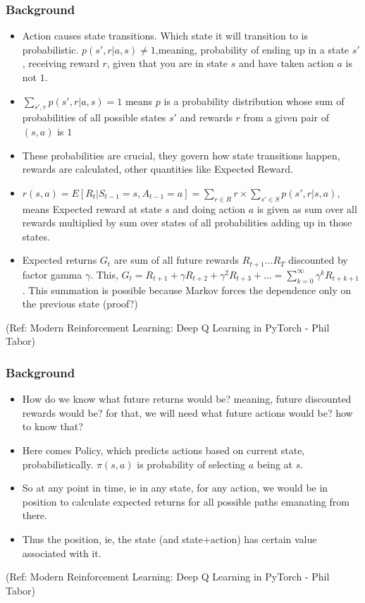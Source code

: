 \begin{frame}[fragile]\frametitle{Background}

\begin{itemize}
\item Action causes state transitions. Which state it will transition to is probabilistic. $p(s',r|a,s) \neq 1$,meaning,  probability of ending up in a state $s'$, receiving reward $r$, given that you are in state $s$ and have taken action $a$ is not $1$. 
\item $\sum_{s',r} p (s',r|a,s) = 1 $ means $p$ is a probability distribution whose sum of probabilities of all possible states $s'$ and rewards $r$ from a given pair of $(s,a)$ is $1$
\item These probabilities are crucial, they govern how state transitions happen, rewards are calculated, other quantities like Expected Reward.
\item $r(s,a) = E[R_t|S_{t-1}=s,A_{t-1}=a] = \sum_{r \in R} r \times \sum_{s' \in S}  p(s',r|s,a)$, means Expected reward at state $s$ and doing action $a$ is given as sum over all rewards  multiplied by sum over states of all probabilities adding up in those states.
\item Expected returns $G_t$ are sum of all future rewards $R_{t+1} \ldots R_T$ discounted by factor gamma $\gamma$. This, $G_t = R_{t+1} + \gamma R_{t+2} + \gamma^2R_{t+3} + \ldots = \sum_{k=0}^{\infty} \gamma^kR_{t+k+1}$. This summation is possible because Markov forces the dependence only on the previous state (proof?)
\end{itemize}

{\tiny (Ref: Modern Reinforcement Learning: Deep Q Learning in PyTorch - Phil Tabor)}

\end{frame}

\begin{frame}[fragile]\frametitle{Background}

\begin{itemize}
\item How do we know what future returns would be? meaning, future discounted rewards would be? for that, we will need what future actions would be? how to know that?
\item Here comes Policy, which predicts actions based on current state, probabilistically. $\pi(s,a)$ is probability of selecting $a$ being at $s$.
\item So at any point in time, ie in any state, for any action, we would be in position to calculate expected returns for all possible paths emanating from there.
\item Thus the position, ie, the state (and state+action) has certain value associated with it.
\end{itemize}

{\tiny (Ref: Modern Reinforcement Learning: Deep Q Learning in PyTorch - Phil Tabor)}

\end{frame}


